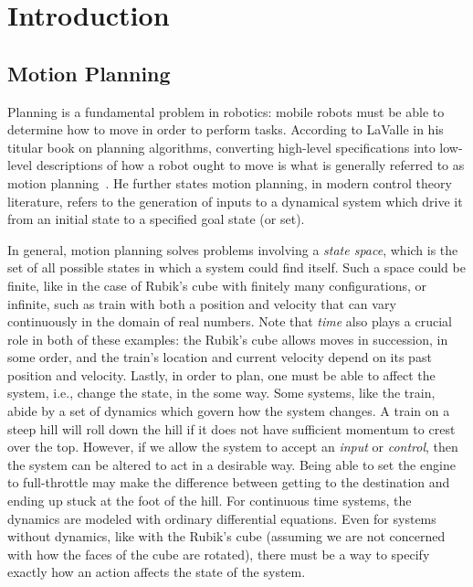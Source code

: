 \renewcommand{\L}{\mathcal{L}}
\chapter{Introduction}\label{chap:intro}

\section{Motion Planning}

Planning is a fundamental problem in robotics: mobile robots must be able to determine how to move in order to perform tasks. According to LaValle in his titular book on planning algorithms, converting high-level specifications into low-level descriptions of how a robot ought to move is what is generally referred to as motion planning~\cite{LaValle2006}. He further states motion planning, in modern control theory literature, refers to the generation of inputs to a dynamical system which drive it from an initial state to a specified goal state (or set).

In general, motion planning solves problems involving a \emph{state space}, which is the set of all possible states in which a system could find itself. Such a space could be finite, like in the case of Rubik's cube with finitely many configurations, or infinite, such as train with both a position and velocity that can vary continuously in the domain of real numbers. Note that \emph{time} also plays a crucial role in both of these examples: the Rubik's cube allows moves in succession, in some order, and the train's location and current velocity depend on its past position and velocity. Lastly, in order to plan, one must be able to affect the system, i.e., change the state, in the some way. Some systems, like the train, abide by a set of dynamics which govern how the system changes. A train on a steep hill will roll down the hill if it does not have sufficient momentum to crest over the top. However, if we allow the system to accept an \emph{input} or \emph{control}, then the system can be altered to act in a desirable way. Being able to set the engine to full-throttle may make the difference between getting to the destination and ending up stuck at the foot of the hill. For continuous time systems, the dynamics are modeled with ordinary differential equations. Even for systems without dynamics, like with the Rubik's cube (assuming we are not concerned with how the faces of the cube are rotated), there must be a way to specify exactly how an action affects the state of the system.

